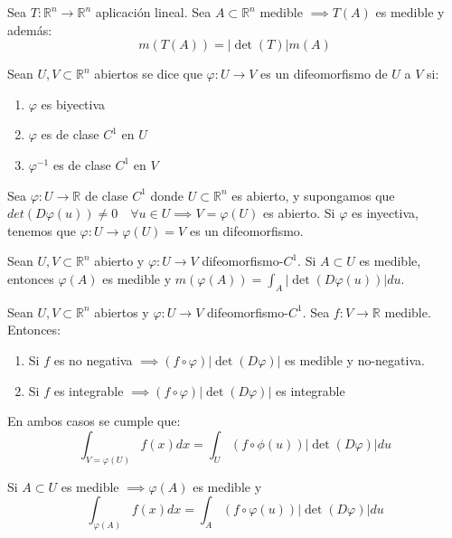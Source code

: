 \begin{teorema}
    Sea $T: \mathbb{R}^n \to \mathbb{R}^n$ aplicación lineal. Sea $A \subset \mathbb{R}^n$ medible $\implies T(A)$ es medible y además:
    \[m(T(A)) = |\det(T)|m(A)\]
\end{teorema}
\begin{definición} 
Sean $U, V \subset \mathbb{R}^n$ abiertos se dice que $\varphi: U \to V$ es un difeomorfismo de $U$ a $V$ si:
\vspace{-0.5em}
\begin{enumerate}
    \item $\varphi$ es biyectiva
    \item $\varphi$ es de clase $C^1$ en $U$
    \item $\varphi^{-1}$ es de clase $C^1$ en $V$
\end{enumerate}
\end{definición}
\begin{observación}
Sea $\varphi: U \to \mathbb{R}$ de clase $C^1$ donde $U \subset \mathbb{R}^n$ es abierto, y supongamos que $det(D\varphi(u)) \neq 0 \quad \forall u \in U \implies V = \varphi(U)$ es abierto. Si $\varphi$ es inyectiva, tenemos que $\varphi: U \to \varphi(U) = V$ es un difeomorfismo.
\end{observación}

\begin{teorema}
    Sean $U, V \subset \mathbb{R}^n$ abierto y $\varphi: U \to V$ difeomorfismo-$C^{1}$. Si $A \subset U$ es medible, entonces $\varphi(A)$ es medible y $m(\varphi(A)) = \int_{A}|\det(D\varphi(u))|du$.
\end{teorema}

\begin{teorema}
    Sean $U,V \subset \mathbb{R}^n$ abiertos y $\varphi: U \to V$ difeomorfismo-$C^1$. Sea $f: V \to \mathbb{R}$ medible. Entonces:
    \begin{enumerate}
        \item Si $f$ es no negativa $\implies (f \circ \varphi) |\det(D\varphi)|$ es medible
              y no-negativa.
        \item Si $f$ es integrable $\implies (f \circ \varphi)|\det(D\varphi)|$ es integrable \end{enumerate}
    En ambos casos se cumple que:
    $$\int_{V = \varphi(U)} f(x)dx = \int_U (f \circ \phi(u))|\det(D\varphi)|du$$
\end{teorema}
\begin{observación}
Si $A \subset U$ es medible $\implies \varphi(A)$ es medible y
$$\int_{\varphi(A)}f(x)dx = \int_{A}(f \circ \varphi(u))|\det(D\varphi)|du$$
\end{observación}

